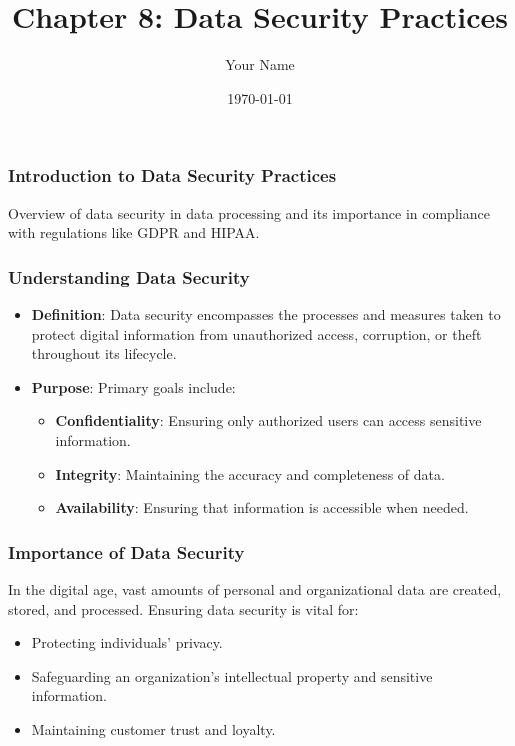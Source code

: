 \documentclass{beamer}
\title{Chapter 8: Data Security Practices}
\author{Your Name}
\institute{Your Institution}
\date{\today}
\begin{document}
\frame{\titlepage}

\begin{frame}[fragile]
    \frametitle{Introduction to Data Security Practices}
    Overview of data security in data processing and its importance in compliance with regulations like GDPR and HIPAA.
\end{frame}

\begin{frame}[fragile]
    \frametitle{Understanding Data Security}
    \begin{itemize}
        \item \textbf{Definition}: Data security encompasses the processes and measures taken to protect digital information from unauthorized access, corruption, or theft throughout its lifecycle.
        \item \textbf{Purpose}: Primary goals include:
        \begin{itemize}
            \item \textbf{Confidentiality}: Ensuring only authorized users can access sensitive information.
            \item \textbf{Integrity}: Maintaining the accuracy and completeness of data.
            \item \textbf{Availability}: Ensuring that information is accessible when needed.
        \end{itemize}
    \end{itemize}
\end{frame}

\begin{frame}[fragile]
    \frametitle{Importance of Data Security}
    In the digital age, vast amounts of personal and organizational data are created, stored, and processed. Ensuring data security is vital for:
    \begin{itemize}
        \item Protecting individuals' privacy.
        \item Safeguarding an organization’s intellectual property and sensitive information.
        \item Maintaining customer trust and loyalty.
    \end{itemize}
\end{frame}
\end{document}
